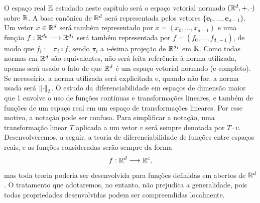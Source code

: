 O espaço real $\mathbb{E}$ estudado neste capítulo será o espaço vetorial normado $(\mathbb{R}^d,+,\cdot)$ sobre $\mathbb{R}$. A base canônica de $\mathbb{R}^d$ será representada pelos vetores $\{\bm e_0, \ldots, \bm e_{d-1}\}$. Um vetor $x \in \mathbb{R}^d$ será também representado por $x=(x_0,\ldots,x_{d-1})$ e uma função $f: \mathbb{R}^{d_0} \longrightarrow \mathbb{R}^{d_1}$ será também representada por $f=(f_0,\ldots,f_{d_1-1})$, de modo que $f_i := \pi_i \circ f$, sendo $\pi_i$ a $i$-ésima projeção de $\mathbb{R}^{d_1}$ em $\mathbb{R}$. Como todas normas em $\mathbb{R}^d$ são equivalentes, não será feita referência à norma utilizada, apenas será usado o fato de que $\mathbb{R}^d$ é um espaço vetorial normado (e completo). Se necessário, a norma utilizada será explicitada e, quando não for, a norma usada será $\left\Vert{\cdot}\right\Vert_2$. O estudo da diferenciabilidade em espaços de dimensão maior que 1 envolve o uso de funções contínuas e transformações lineares, e também de funções de um espaço real em um espaço de transformações lineares. Por esse motivo, a notação pode ser confusa. Para simplificar a notação, uma transformação linear $T$ aplicada a um vetor $v$ será sempre denotada por $T \cdot v$. Desenvolveremos, a seguir, a teoria de diferenciabilidade de funções entre espaços reais, e as funções consideradas serão sempre da forma
	\begin{equation*}
	f: \mathbb{R}^d \longrightarrow \mathbb{R}^c,
	\end{equation*}
mas toda teoria poderia ser desenvolvida para funções definidas em abertos de $\mathbb{R}^d$. O tratamento que adotaremos, no entanto, não prejudica a generalidade, pois todas propriedades desenvolvidas podem ser compreendidas localmente.


